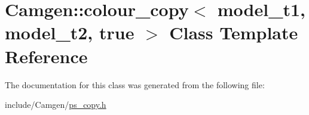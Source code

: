 \hypertarget{a00068}{}\section{Camgen\+:\+:colour\+\_\+copy$<$ model\+\_\+t1, model\+\_\+t2, true $>$ Class Template Reference}
\label{a00068}


The documentation for this class was generated from the following file\+:\begin{DoxyCompactItemize}
\item 
include/\+Camgen/\hyperlink{a00740}{ps\+\_\+copy.\+h}\end{DoxyCompactItemize}
